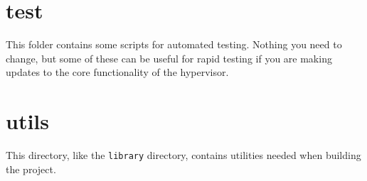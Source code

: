 \documentclass[a4paper,11pt,reqno]{amsart}
\begin{document}
\section{test}
\noindent
This folder contains some scripts for automated testing. Nothing you need to change, but some of these can be useful for rapid testing if you are making updates to the core functionality of the hypervisor.

\section{utils}
\noindent
This directory, like the \texttt{library} directory, contains utilities needed when building the project.
\end{document}
